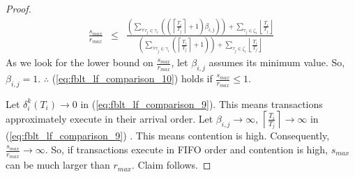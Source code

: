 \documentclass[12pt,english]{report}
\newtheorem{proof}{Proof}
\begin{document}
\begin{proof}
\begin{eqnarray}
\frac{s_{max}}{r_{max}} & \le & \frac{\left(\sum_{\forall\tau_{j}\in\gamma_{i}}\left(\left(\left\lceil \frac{T_{i}}{T_{j}}\right\rceil +1\right)\beta_{i,j}\right)\right)+\sum_{\tau_{j}\in\zeta_{i}}\left\lfloor \frac{T_{i}}{T_{j}}\right\rfloor }{\left(\sum_{\forall\tau_{j}\in\gamma_{i}}\left(\left\lceil \frac{T_{i}}{T_{j}}\right\rceil +1\right)\right)+\sum_{\tau_{j}\in\zeta_{i}}\left\lfloor \frac{T_{i}}{T_{j}}\right\rfloor }\label{eq:fblt_lf_comparison_10}
\end{eqnarray}
As we look for the lower bound on $\frac{s_{max}}{r_{max}}$, let
$\beta_{i,j}$ assumes its minimum value. So, $\beta_{i,j}=1$. $\therefore$
(\ref{eq:fblt_lf_comparison_10}) holds if $\frac{s_{max}}{r_{max}}\le1$.

Let $\delta_{i}^{k}(T_{i})\rightarrow0$ in (\ref{eq:fblt_lf_comparison_9}).
This means transactions approximately execute in their arrival order.
Let $\beta_{i,j}\rightarrow\infty,\,\left\lceil \frac{T_{i}}{T_{j}}\right\rceil \rightarrow\infty$
in (\ref{eq:fblt_lf_comparison_9}) . This means contention is high.
Consequently, $\frac{s_{max}}{r_{max}}\rightarrow\infty$. So, if
transactions execute in FIFO order and contention is high, $s_{max}$
can be much larger than $r_{max}$. Claim follows.

\end{proof}



\end{document}
